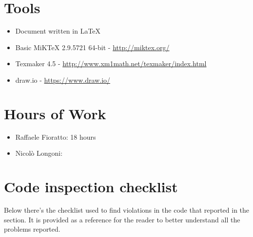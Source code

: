 \newpage
\begin{appendices}
\section{Tools}
\begin{itemize}
	\item Document written in \LaTeX
	\item Basic MiKTeX 2.9.5721 64-bit - \url{http://miktex.org/}
	\item Texmaker 4.5 - \url{http://www.xm1math.net/texmaker/index.html}
	\item draw.io - \url{https://www.draw.io/}
\end{itemize}
\break
\section{Hours of Work}
\begin{itemize}
	\item Raffaele Fioratto: 18 hours
	\item Nicol\`{o} Longoni:
\end{itemize}
\break
\section{Code inspection checklist}
Below there's the checklist used to find violations in the code that reported in the  section. It is provided as a reference for the reader to better understand all the problems reported.

\end{appendices}